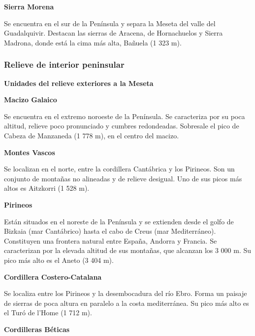 \vspace{3mm}
\textbf{Sierra Morena}

\vspace{3mm}
Se encuentra en el sur de la Península y separa la Meseta del valle del Guadalquivir. Destacan las sierras de Aracena, de Hornachuelos y Sierra Madrona, donde está la cima más alta, Bañuela (1 323 m).

\subsubsection{Relieve de interior peninsular}

\textbf{Unidades del relieve exteriores a la Meseta}

\vspace{3mm}
\textbf{Macizo Galaico}

\vspace{3mm}
Se encuentra en el extremo noroeste de la Península. Se caracteriza por su poca altitud, relieve poco pronunciado y cumbres redondeadas. Sobresale el pico de Cabeza de Manzaneda (1 778 m), en el centro del macizo.

\vspace{3mm}
\textbf{Montes Vascos}

\vspace{3mm}
Se localizan en el norte, entre la cordillera Cantábrica y los Pirineos. Son un conjunto de montañas no alineadas y de relieve desigual. Uno de sus picos más altos es Aitzkorri (1 528 m).

\vspace{3mm}
\textbf{Pirineos}

\vspace{3mm}
Están situados en el noreste de la Península y se extienden desde el golfo de Bizkaia (mar Cantábrico) hasta el cabo de Creus (mar Mediterráneo). Constituyen una frontera natural entre España, Andorra y Francia. Se caracterizan por la elevada altitud de sus montañas, que alcanzan los 3 000 m. Su pico más alto es el Aneto (3 404 m).

\vspace{3mm}
\textbf{Cordillera Costero-Catalana}

\vspace{3mm}
Se localiza entre los Pirineos y la desembocadura del río Ebro. Forma un paisaje de sierras de poca altura en paralelo a la costa mediterránea. Su pico más alto es el Turó de l’Home (1 712 m).

\vspace{3mm}
\textbf{Cordilleras Béticas}


